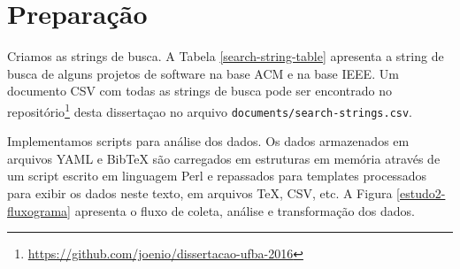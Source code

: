 

\section{Preparação} \label{estudo2:preparacao} %

Criamos as strings de busca. A Tabela \ref{search-string-table} apresenta a
string de busca de alguns projetos de software na base ACM e na base IEEE.
Um documento CSV com todas as strings de busca pode ser encontrado no
repositório\footnote{\url{https://github.com/joenio/dissertacao-ufba-2016}}
desta dissertaçao no arquivo \texttt{documents/search-strings.csv}.



Implementamos scripts para análise dos dados. Os dados armazenados em arquivos
YAML e BibTeX são carregados em estruturas em memória através de um script
escrito em linguagem Perl e repassados para templates processados para exibir
os dados neste texto, em arquivos TeX, CSV, etc. A Figura \ref{estudo2-fluxograma}
apresenta o fluxo de coleta, análise e transformação dos dados.

